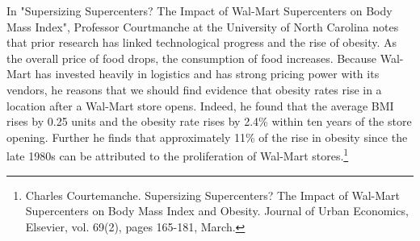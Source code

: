 \fontsize{12bp}{14bp}\selectfont
In "Supersizing Supercenters? The Impact of Wal-Mart Supercenters on Body Mass Index", Professor Courtmanche at the University of North Carolina notes that prior research has linked technological progress and the rise of obesity.  As the overall price of food drops, the consumption of food increases.  Because Wal-Mart has invested heavily in logistics and has strong pricing power with its vendors, he reasons that we should find evidence that obesity rates rise in a location after a Wal-Mart store opens.  Indeed, he found that the average BMI rises by 0.25 units and the obesity rate rises by 2.4\% within ten years of the store opening.  Further he finds that approximately 11\% of the rise in obesity since the late 1980s can be attributed to the proliferation of Wal-Mart stores.\footnote{Charles Courtemanche. Supersizing Supercenters? The Impact of Wal-Mart Supercenters on Body Mass Index and Obesity. Journal of Urban Economics, Elsevier, vol. 69(2), pages 165-181, March.}